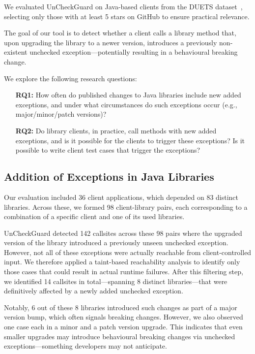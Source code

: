 We evaluated UnCheckGuard on Java-based clients from the DUETS dataset~\cite{durieux21:_duets}, selecting only those with at least 5 stars on GitHub to ensure practical relevance.

The goal of our tool is to detect whether a client calls a library method that, upon upgrading the library to a newer version, introduces a previously non-existent unchecked exception—potentially resulting in a behavioural breaking change.

We explore the following research questions:

\begin{itemize}
  \item[\textbf{RQ1:}] How often do published changes to Java libraries include new added exceptions, and under what circumstances do such exceptions occur (e.g., major/minor/patch versions)?
  \item[\textbf{RQ2:}] Do library clients, in practice, call methods with new added exceptions, and is it possible for the clients to trigger these exceptions? Is it possible to write client test cases that trigger the exceptions?
\end{itemize}

\subsection{Addition of Exceptions in Java Libraries}

Our evaluation included 36 client applications, which depended on 83 distinct libraries. Across these, we formed 98 client-library pairs, each corresponding to a combination of a specific client and one of its used libraries. 

UnCheckGuard detected 142 callsites across these 98 pairs where the upgraded version of the library introduced a previously unseen unchecked exception. However, not all of these exceptions were actually reachable from client-controlled input. We therefore applied a taint-based reachability analysis to identify only those cases that could result in actual runtime failures. After this filtering step, we identified 14 callsites in total—spanning 8 distinct libraries—that were definitively affected by a newly added unchecked exception. 

Notably, 6 out of these 8 libraries introduced such changes as part of a major version bump, which often signals breaking changes. However, we also observed one case each in a minor and a patch version upgrade. This indicates that even smaller upgrades may introduce behavioural breaking changes via unchecked exceptions—something developers may not anticipate.

